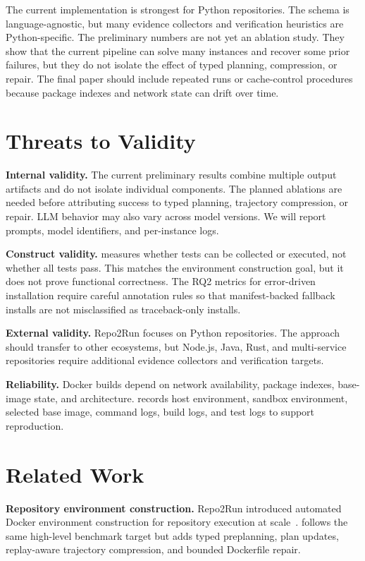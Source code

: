 The current implementation is strongest for Python repositories.
The \ttg schema is language-agnostic, but many evidence collectors and verification heuristics are Python-specific.
The preliminary numbers are not yet an ablation study.
They show that the current pipeline can solve many instances and recover some prior failures, but they do not isolate the effect of typed planning, compression, or repair.
The final paper should include repeated runs or cache-control procedures because package indexes and network state can drift over time.

\section{Threats to Validity}

\textbf{Internal validity.}
The current preliminary results combine multiple output artifacts and do not isolate individual components.
The planned ablations are needed before attributing success to typed planning, trajectory compression, or repair.
LLM behavior may also vary across model versions.
We will report prompts, model identifiers, and per-instance logs.

\textbf{Construct validity.}
\ebsr measures whether tests can be collected or executed, not whether all tests pass.
This matches the environment construction goal, but it does not prove functional correctness.
The RQ2 metrics for error-driven installation require careful annotation rules so that manifest-backed fallback installs are not misclassified as traceback-only installs.

\textbf{External validity.}
Repo2Run focuses on Python repositories.
The approach should transfer to other ecosystems, but Node.js, Java, Rust, and multi-service repositories require additional evidence collectors and verification targets.

\textbf{Reliability.}
Docker builds depend on network availability, package indexes, base-image state, and architecture.
\tool records host environment, sandbox environment, selected base image, command logs, build logs, and test logs to support reproduction.

\section{Related Work}

\textbf{Repository environment construction.}
Repo2Run introduced automated Docker environment construction for repository execution at scale~\cite{hu2025repo2run}.
\tool follows the same high-level benchmark target but adds typed preplanning, plan updates, replay-aware trajectory compression, and bounded Dockerfile repair.

